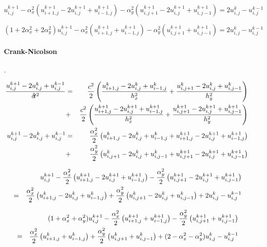 \[
u_{i,j}^{k+1}
-
\alpha_x^2 (u_{i+1,j}^{k+1} -2u_{i,j}^{k+1} +u_{i-1,j}^{k+1} )
-
\alpha_y^2 (u_{i,j+1}^{k+1} -2u_{i,j}^{k+1} +u_{i,j-1}^{k+1} )
=
2u_{i,j}^{k} -u_{i,j}^{k-1} 
\]

\begin{mdframed}[backgroundcolor=blue!5]
\[
(1+2\alpha_x^2+2\alpha_y^2)u_{i,j}^{k+1}
-
\alpha_x^2 (u_{i+1,j}^{k+1}  +u_{i-1,j}^{k+1} )
-
\alpha_y^2 (u_{i,j+1}^{k+1}  +u_{i,j-1}^{k+1} )
=
2u_{i,j}^{k} -u_{i,j}^{k-1} 
\]
\end{mdframed}






\paragraph{Crank-Nicolson}.

\begin{eqnarray}
\frac{ u_{i,j}^{k+1} -2u_{i,j}^{k} +u_{i,j}^{k-1}  }{\delta\! t^2} 
&=& 
\frac{c^2}{2}
\left(
\frac{ u_{i+1,j}^{k} -2u_{i,j}^{k} +u_{i-1,j}^{k}  }{h_x^2} 
+
\frac{ u_{i,j+1}^{k} -2u_{i,j}^{k} +u_{i,j-1}^{k}  }{h_y^2} 
\right)
\nonumber\\
&+&
\frac{c^2}{2}
\left(
\frac{ u_{i+1,j}^{k+1} -2u_{i,j}^{k+1} +u_{i-1,j}^{k+1}  }{h_x^2} 
+
\frac{ u_{i,j+1}^{k+1} -2u_{i,j}^{k+1} +u_{i,j-1}^{k+1}  }{h_y^2} 
\right) 
\nonumber\\
u_{i,j}^{k+1} -2u_{i,j}^{k} +u_{i,j}^{k-1}  
&=&
\frac{\alpha_x^2}{2}
\left(
 u_{i+1,j}^{k} -2u_{i,j}^{k} +u_{i-1,j}^{k}  
+
 u_{i+1,j}^{k+1} -2u_{i,j}^{k+1} +u_{i-1,j}^{k+1}
\right) \nonumber\\
&+&
\frac{\alpha_y^2}{2}
\left(
u_{i,j+1}^{k} -2u_{i,j}^{k} +u_{i,j-1}^{k}  
+
u_{i,j+1}^{k+1} -2u_{i,j}^{k+1} +u_{i,j-1}^{k+1}
\right)
\nonumber
\end{eqnarray}

\begin{eqnarray}
&&u_{i,j}^{k+1} 
-\frac{\alpha_x^2}{2} \left( u_{i+1,j}^{k+1} -2u_{i,j}^{k+1} +u_{i-1,j}^{k+1} \right) 
-\frac{\alpha_y^2}{2} \left( u_{i,j+1}^{k+1} -2u_{i,j}^{k+1} +u_{i,j-1}^{k+1} \right) \nonumber\\
&=&
 \frac{\alpha_x^2}{2} \left( u_{i+1,j}^{k} -2u_{i,j}^{k} +u_{i-1,j}^{k}  \right)
+\frac{\alpha_y^2}{2} \left( u_{i,j+1}^{k} -2u_{i,j}^{k} +u_{i,j-1}^{k}  \right)
+2u_{i,j}^{k} -u_{i,j}^{k-1}  
\end{eqnarray}



\begin{mdframed}[backgroundcolor=blue!5]
\begin{eqnarray}
&&(1+\alpha_x^2+\alpha_y^2) u_{i,j}^{k+1} 
-\frac{\alpha_x^2}{2} \left( u_{i+1,j}^{k+1}  +u_{i-1,j}^{k+1} \right) 
-\frac{\alpha_y^2}{2} \left( u_{i,j+1}^{k+1}  +u_{i,j-1}^{k+1} \right) \nonumber\\
&=&
 \frac{\alpha_x^2}{2} \left( u_{i+1,j}^{k}  +u_{i-1,j}^{k}  \right)
+\frac{\alpha_y^2}{2} \left( u_{i,j+1}^{k}  +u_{i,j-1}^{k}  \right)
+(2-\alpha_x^2-\alpha_y^2)u_{i,j}^{k} -u_{i,j}^{k-1}  \label{eq:fdmwave2dCR}
\end{eqnarray}
\end{mdframed}

